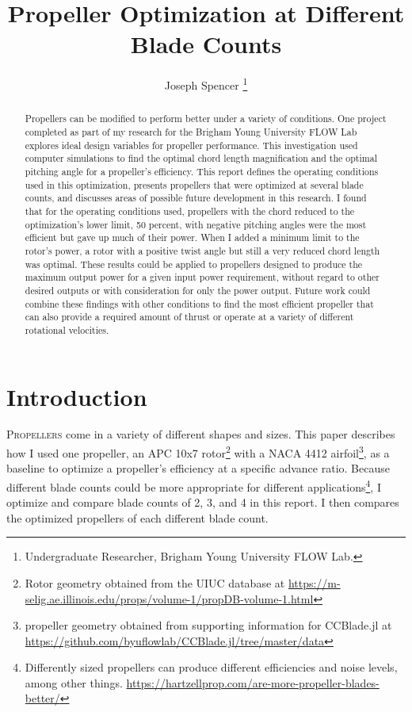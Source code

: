 \documentclass[journal ]{new-aiaa}
\title{Propeller Optimization at Different Blade Counts}
\author{Joseph Spencer \footnote{Undergraduate Researcher, Brigham Young University FLOW Lab.}}
\affil{Brigham Young University, Provo, Utah, 84601}
\begin{document}
\maketitle

\begin{abstract}

Propellers can be modified to perform better under a variety of conditions. One project completed as part of my research for the Brigham Young University FLOW Lab explores ideal design variables for propeller performance. This investigation used computer simulations to find the optimal chord length magnification and the optimal pitching angle for a propeller's efficiency. This report defines the operating conditions used in this optimization, presents propellers that were optimized at several blade counts, and discusses areas of possible future development in this research. I found that for the operating conditions used, propellers with the chord reduced to the optimization's lower limit, 50 percent, with negative pitching angles were the most efficient but gave up much of their power. When I added a minimum limit to the rotor's power, a rotor with a positive twist angle but still a very reduced chord length was optimal. These results could be applied to propellers designed to produce the maximum output power for a given input power requirement, without regard to other desired outputs or with consideration for only the power output. Future work could combine these findings with other conditions to find the most efficient propeller that can also provide a required amount of thrust or operate at a variety of different rotational velocities.

\end{abstract}


\section{Introduction}

\lettrine{P}{ropellers} come in a variety of different shapes and sizes. This paper describes how I used one propeller, an APC 10x7 rotor\footnote{Rotor geometry obtained from the UIUC database at \url{https://m-selig.ae.illinois.edu/props/volume-1/propDB-volume-1.html}} with a NACA 4412 airfoil\footnote{propeller geometry obtained from supporting information for CCBlade.jl at \url{https://github.com/byuflowlab/CCBlade.jl/tree/master/data}}, as a baseline to optimize a propeller's efficiency at a specific advance ratio. Because different blade counts could be more appropriate for different applications\footnote{Differently sized propellers can produce different efficiencies and noise levels, among other things. \url{https://hartzellprop.com/are-more-propeller-blades-better/}}, I optimize and compare blade counts of 2, 3, and 4 in this report. I then compares the optimized propellers of each different blade count.
\end{document}
